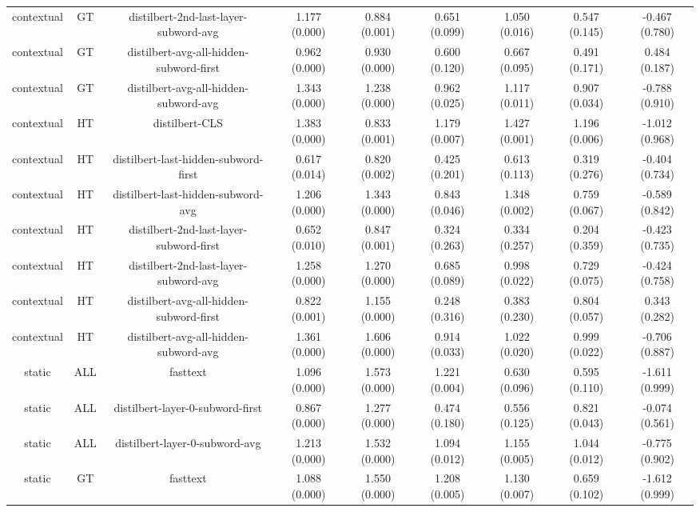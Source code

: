 \begin{sidewaystable}[htb]
\begin{tabular}{@{}ccccccccc@{}}
        contextual & GT & distilbert-2nd-last-layer-subword-avg & 1.177 (0.000) & 0.884 (0.001) & 0.651 (0.099) & 1.050 (0.016) & 0.547 (0.145) & -0.467 (0.780) \\
        contextual & GT & distilbert-avg-all-hidden-subword-first & 0.962 (0.000) & 0.930 (0.000) & 0.600 (0.120) & 0.667 (0.095) & 0.491 (0.171) & 0.484 (0.187) \\
        contextual & GT & distilbert-avg-all-hidden-subword-avg & 1.343 (0.000) & 1.238 (0.000) & 0.962 (0.025) & 1.117 (0.011) & 0.907 (0.034) & -0.788 (0.910) \\
        contextual & HT & distilbert-CLS & 1.383 (0.000) & 0.833 (0.001) & 1.179 (0.007) & 1.427 (0.001) & 1.196 (0.006) & -1.012 (0.968) \\
        contextual & HT & distilbert-last-hidden-subword-first & 0.617 (0.014) & 0.820 (0.002) & 0.425 (0.201) & 0.613 (0.113) & 0.319 (0.276) & -0.404 (0.734) \\
        contextual & HT & distilbert-last-hidden-subword-avg & 1.206 (0.000) & 1.343 (0.000) & 0.843 (0.046) & 1.348 (0.002) & 0.759 (0.067) & -0.589 (0.842) \\
        contextual & HT & distilbert-2nd-last-layer-subword-first & 0.652 (0.010) & 0.847 (0.001) & 0.324 (0.263) & 0.334 (0.257) & 0.204 (0.359) & -0.423 (0.735) \\
        contextual & HT & distilbert-2nd-last-layer-subword-avg & 1.258 (0.000) & 1.270 (0.000) & 0.685 (0.089) & 0.998 (0.022) & 0.729 (0.075) & -0.424 (0.758) \\
        contextual & HT & distilbert-avg-all-hidden-subword-first & 0.822 (0.001) & 1.155 (0.000) & 0.248 (0.316) & 0.383 (0.230) & 0.804 (0.057) & 0.343 (0.282) \\
        contextual & HT & distilbert-avg-all-hidden-subword-avg & 1.361 (0.000) & 1.606 (0.000) & 0.914 (0.033) & 1.022 (0.020) & 0.999 (0.022) & -0.706 (0.887) \\
        static & ALL & fasttext & 1.096 (0.000) & 1.573 (0.000) & 1.221 (0.004) & 0.630 (0.096) & 0.595 (0.110) & -1.611 (0.999) \\
        static & ALL & distilbert-layer-0-subword-first & 0.867 (0.000) & 1.277 (0.000) & 0.474 (0.180) & 0.556 (0.125) & 0.821 (0.043) & -0.074 (0.561) \\
        static & ALL & distilbert-layer-0-subword-avg & 1.213 (0.000) & 1.532 (0.000) & 1.094 (0.012) & 1.155 (0.005) & 1.044 (0.012) & -0.775 (0.902) \\
        static & GT & fasttext & 1.088 (0.000) & 1.550 (0.000) & 1.208 (0.005) & 1.130 (0.007) & 0.659 (0.102) & -1.612 (0.999) \\

\end{tabular}
\end{sidewaystable}
